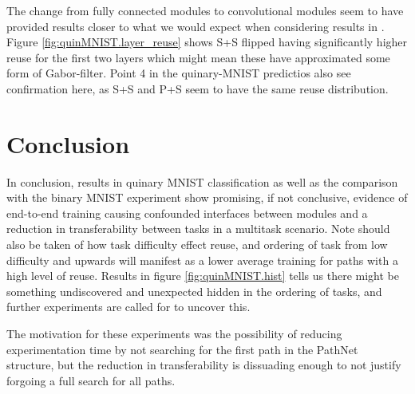 The change from fully connected modules to convolutional modules seem to have provided results closer to what we would expect when considering results in \cite{yosinski2014transferable}. Figure \ref{fig:quinMNIST.layer_reuse} shows S+S flipped having significantly higher reuse for the first two layers which might mean these have approximated some form of Gabor-filter. Point 4 in the quinary-MNIST predictios also see confirmation here, as S+S and P+S seem to have the same reuse distribution. 

\section{Conclusion}
In conclusion, results in quinary MNIST classification as well as the comparison with the binary MNIST experiment show promising, if not conclusive, evidence of end-to-end training causing confounded interfaces between modules and a reduction in transferability between tasks in a multitask scenario. Note should also be taken of how task difficulty effect reuse, and ordering of task from low difficulty and upwards will manifest as a lower average training for paths with a high level of reuse. Results in figure \ref{fig:quinMNIST.hist} tells us there might be something undiscovered and unexpected hidden in the ordering of tasks, and further experiments are called for to uncover this. 

The motivation for these experiments was the possibility of reducing experimentation time by not searching for the first path in the PathNet structure, but the reduction in transferability is dissuading enough to not justify forgoing a full search for all paths. 

